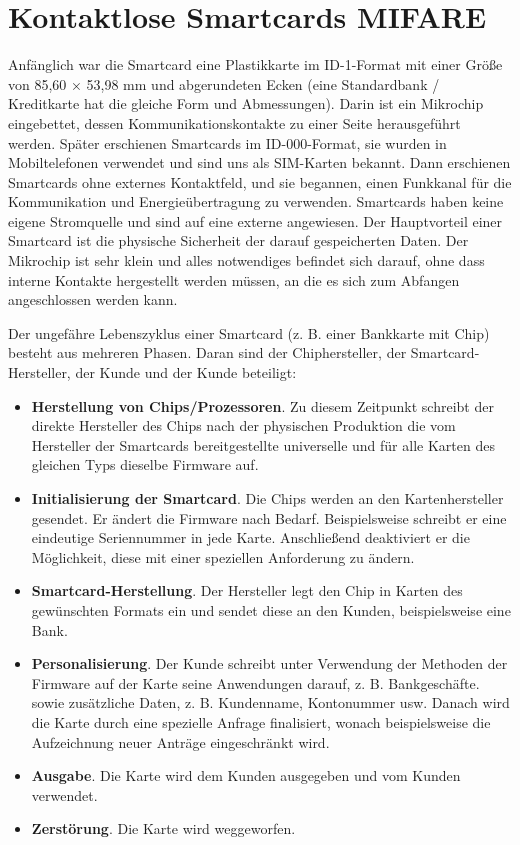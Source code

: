 \section{Kontaktlose Smartcards MIFARE}
\label{sec:theorie:mifare}
Anfänglich war die Smartcard eine Plastikkarte im ID-1-Format mit einer Größe von 85,60 × 53,98 mm und abgerundeten Ecken (eine Standardbank / Kreditkarte hat die gleiche Form und Abmessungen). Darin ist ein Mikrochip eingebettet, dessen Kommunikationskontakte zu einer Seite herausgeführt werden. Später erschienen Smartcards im ID-000-Format, sie wurden in Mobiltelefonen verwendet und sind uns als SIM-Karten bekannt. Dann erschienen Smartcards ohne externes Kontaktfeld, und sie begannen, einen Funkkanal für die Kommunikation und Energieübertragung zu verwenden. Smartcards haben keine eigene Stromquelle und sind auf eine externe angewiesen. Der Hauptvorteil einer Smartcard ist die physische Sicherheit der darauf gespeicherten Daten. Der Mikrochip ist sehr klein und alles notwendiges befindet sich darauf, ohne dass interne Kontakte hergestellt werden müssen, an die es sich zum Abfangen angeschlossen werden kann. 

Der ungefähre Lebenszyklus einer Smartcard (z. B. einer Bankkarte mit Chip) besteht aus mehreren Phasen. Daran sind der Chiphersteller, der Smartcard-Hersteller, der Kunde und der Kunde beteiligt:

\begin{itemize}
	\item \textbf{Herstellung von Chips/Prozessoren}. Zu diesem Zeitpunkt schreibt der direkte Hersteller des Chips nach der physischen Produktion die vom Hersteller der Smartcards bereitgestellte universelle und für alle Karten des gleichen Typs dieselbe Firmware auf.
\item \textbf{Initialisierung der Smartcard}. Die Chips werden an den Kartenhersteller gesendet. Er ändert die Firmware nach Bedarf. Beispielsweise schreibt er eine eindeutige Seriennummer in jede Karte. Anschließend deaktiviert er die Möglichkeit, diese mit einer speziellen Anforderung zu ändern.
\item \textbf{Smartcard-Herstellung}. Der Hersteller legt den Chip in Karten des gewünschten Formats ein und sendet diese an den Kunden, beispielsweise eine Bank.
\item \textbf{Personalisierung}. Der Kunde schreibt unter Verwendung der Methoden der Firmware auf der Karte seine Anwendungen darauf, z. B. Bankgeschäfte. sowie zusätzliche Daten, z. B. Kundenname, Kontonummer usw. Danach wird die Karte durch eine spezielle Anfrage finalisiert, wonach beispielsweise die Aufzeichnung neuer Anträge eingeschränkt wird.
\item \textbf{Ausgabe}. Die Karte wird dem Kunden ausgegeben und vom Kunden verwendet.
\item \textbf{Zerstörung}. Die Karte wird weggeworfen.
\end{itemize}

